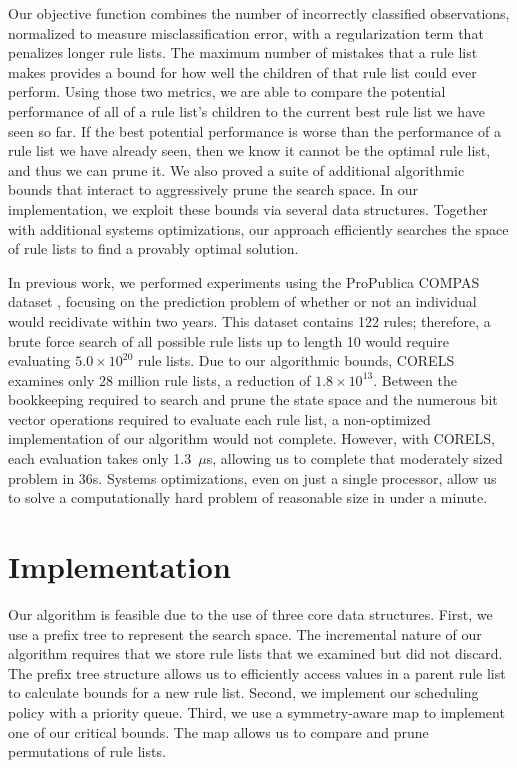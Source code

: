 \documentclass[format=sigconf]{acmart}
\begin{document}
Our objective function combines the number of incorrectly classified observations, normalized to measure misclassification error, with a regularization term that penalizes longer rule lists.
The maximum number of mistakes that a rule list makes provides a bound for how well the children of that rule list could ever perform.
Using those two metrics, we are able to compare the potential performance of all of a rule list's children to the current best rule list we have seen so far.
If the best potential performance is worse than the performance of a rule list we have already seen, then we know it cannot be the optimal rule list, and thus we can prune it.
We also proved a suite of additional algorithmic bounds that interact to aggressively prune the search space.
In our implementation, we exploit these bounds via several data structures.  
Together with additional systems optimizations, our approach efficiently searches the space of rule lists to find a provably optimal solution.

In previous work, we performed experiments using the ProPublica COMPAS dataset \cite{LarsonMaKiAn16}, focusing on the prediction problem of whether or not an individual would recidivate within two years.
This dataset contains 122 rules; therefore, a brute force search of all possible rule lists up to length 10 would require evaluating ${5.0 \times 10^{20}}$ rule lists.
Due to our algorithmic bounds, CORELS examines only 28 million rule lists, a reduction of ${1.8 \times 10^{13}}$.
Between the bookkeeping required to search and prune the state space and the numerous bit vector operations required to evaluate each rule list, a non-optimized implementation of our algorithm would not complete.
However, with CORELS, each evaluation takes only 1.3~$\mu$s, allowing us to complete that moderately sized problem in 36s.
Systems optimizations, even on just a single processor, allow us to solve a computationally hard problem of reasonable size in under a minute.

\section{Implementation}
Our algorithm is feasible due to the use of three core data structures.
First, we use a prefix tree to represent the search space.
The incremental nature of our algorithm requires that we store rule lists that we examined but did not discard.
The prefix tree structure allows us to efficiently access values in a parent rule list to calculate bounds for a new rule list.
Second, we implement our scheduling policy with a priority queue.
Third, we use a symmetry-aware map to implement one of our critical bounds.
The map allows us to compare and prune permutations of rule lists.
\end{document}

